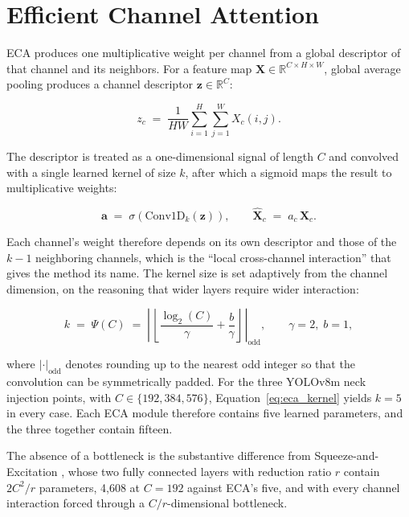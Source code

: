 \documentclass[MScCS]{uccthesis}
\begin{document}
\section{Efficient Channel Attention}
\label{sec:eca}

ECA \parencite{wang2020eca} produces one multiplicative weight per channel from
a global descriptor of that channel and its neighbors. For a feature map
$\mathbf{X} \in \mathbb{R}^{C \times H \times W}$, global average pooling
produces a channel descriptor $\mathbf{z} \in \mathbb{R}^{C}$:

\begin{equation}
   z_c \;=\; \frac{1}{HW}\sum_{i=1}^{H}\sum_{j=1}^{W} X_c(i,j).
   \label{eq:eca_pool}
\end{equation}

The descriptor is treated as a one-dimensional signal of length $C$ and
convolved with a single learned kernel of size $k$, after which a sigmoid maps
the result to multiplicative weights:

\begin{equation}
   \mathbf{a} \;=\; \sigma\!\left( \mathrm{Conv1D}_{k}(\mathbf{z}) \right),
   \qquad
   \widehat{\mathbf{X}}_c \;=\; a_c \, \mathbf{X}_c .
   \label{eq:eca_weights}
\end{equation}

Each channel's weight therefore depends on its own descriptor and those of the
$k-1$ neighboring channels, which is the ``local cross-channel interaction''
that gives the method its name. The kernel size is set adaptively from the
channel dimension, on the reasoning that wider layers require wider
interaction:

\begin{equation}
   k \;=\; \Psi(C) \;=\;
   \left|\, \left\lfloor
      \frac{\log_2 (C)}{\gamma} + \frac{b}{\gamma}
   \right\rfloor \,\right|_{\mathrm{odd}},
   \qquad \gamma = 2, \; b = 1,
   \label{eq:eca_kernel}
\end{equation}

where $|\cdot|_{\mathrm{odd}}$ denotes rounding up to the nearest odd integer so
that the convolution can be symmetrically padded. For the three YOLOv8m neck
injection points, with $C \in \{192, 384, 576\}$, Equation~\eqref{eq:eca_kernel}
yields $k = 5$ in every case. Each ECA module therefore contains five learned
parameters, and the three together contain fifteen.

The absence of a bottleneck is the substantive difference from
Squeeze-and-Excitation \parencite{hu2018squeeze}, whose two fully connected
layers with reduction ratio $r$ contain $2C^{2}/r$ parameters, 4,608 at
$C = 192$ against ECA's five, and with every channel interaction forced through
a $C/r$-dimensional bottleneck.
\end{document}
